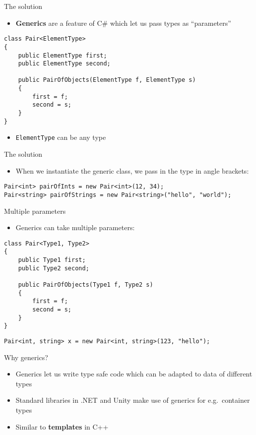 \begin{frame}[fragile]{The solution}
    \begin{itemize}
        \pause\item \textbf{Generics} are a feature of C\# which let us pass types as ``parameters''
    \end{itemize}
    \pause
    \begin{lstlisting}
class Pair<ElementType>
{
    public ElementType first;
    public ElementType second;
    
    public PairOfObjects(ElementType f, ElementType s)
    {
        first = f;
        second = s;
    }
}
    \end{lstlisting}
    \begin{itemize}
        \pause\item \lstinline{ElementType} can be any type
    \end{itemize}
\end{frame}

\begin{frame}[fragile]{The solution}
    \begin{itemize}
        \pause\item When we instantiate the generic class, we pass in the type in angle brackets:
    \end{itemize}
    \pause
    \begin{lstlisting}
Pair<int> pairOfInts = new Pair<int>(12, 34);
Pair<string> pairOfStrings = new Pair<string>("hello", "world");
    \end{lstlisting}
\end{frame}

\begin{frame}[fragile]{Multiple parameters}
    \begin{itemize}
        \pause\item Generics can take multiple parameters:
    \end{itemize}
    \pause
    \begin{lstlisting}
class Pair<Type1, Type2>
{
    public Type1 first;
    public Type2 second;
    
    public PairOfObjects(Type1 f, Type2 s)
    {
        first = f;
        second = s;
    }
}
    \end{lstlisting}
    \begin{lstlisting}
Pair<int, string> x = new Pair<int, string>(123, "hello");
    \end{lstlisting}
\end{frame}

\begin{frame}{Why generics?}
    \begin{itemize}
        \pause\item Generics let us write type safe code which can be adapted to data of different types
        \pause\item Standard libraries in .NET and Unity make use of generics for e.g.\ container types
        \pause\item Similar to \textbf{templates} in C++
    \end{itemize}
\end{frame}


